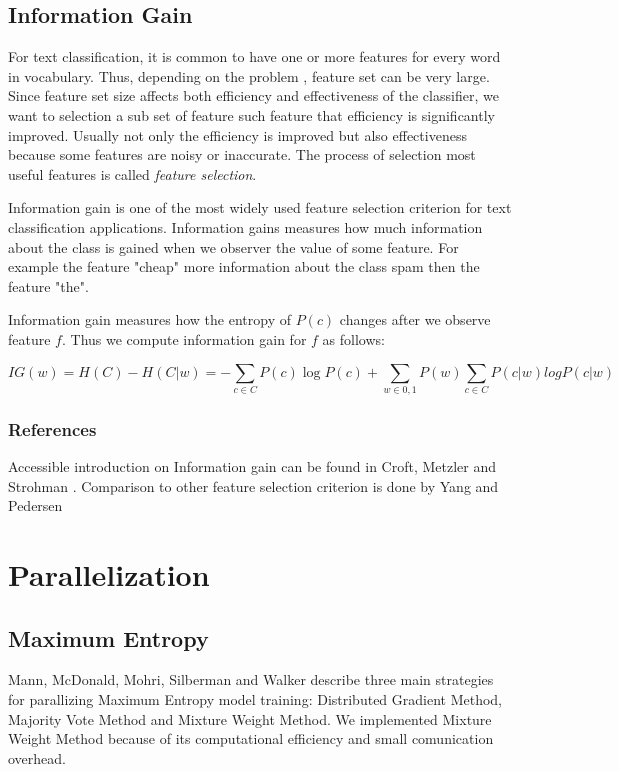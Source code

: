 \documentclass{report}
\begin{document}
\section{Information Gain}
\label{featureselection}

For text classification, it is common to have one or more features for every word in vocabulary. Thus, depending on the problem , feature set can be very large. Since feature set size affects both efficiency and effectiveness of the classifier, we want to selection a sub set of feature such feature that efficiency is significantly improved. Usually not only the efficiency is improved but also effectiveness because some features are noisy or inaccurate. The process of selection most useful features is called \textit{feature selection}.

Information gain is one of the most widely used feature selection criterion for text classification applications. Information gains measures how much information about the class is gained when we observer the value of some feature. For example the feature "cheap" more information about the class spam then the feature "the". 

Information gain measures how the entropy of $P(c)$ changes after we observe feature $f$. Thus we compute information gain for $f$ as follows:

\[
IG(w) = H(C) - H(C|w) = - \sum_{c \in C} P(c) \log P(c) + \sum_{w \in {0,1}} P(w) \sum_{c \in C} P(c|w) log P(c|w)
\]

\subsection{References}

Accessible introduction on Information gain can be found in Croft, Metzler and Strohman \cite{Croft:2010:SEI}. Comparison to other feature selection criterion is done by  Yang and Pedersen  \cite{yang97}

\chapter{Parallelization}

\section{Maximum Entropy}

Mann, McDonald, Mohri, Silberman and Walker \cite{conf/nips/MannMMSW09} describe three main strategies for parallizing Maximum Entropy model training: Distributed Gradient Method, Majority Vote Method and Mixture Weight Method. We implemented Mixture Weight Method because of its computational efficiency and small comunication overhead.
\end{document}
